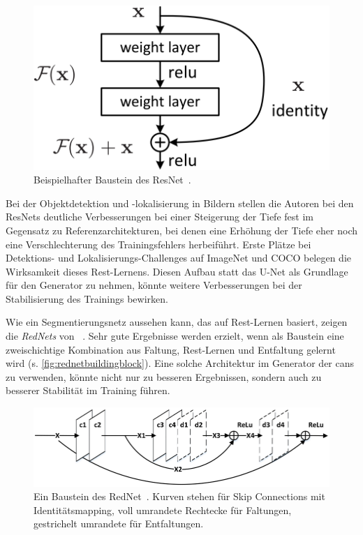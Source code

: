 \begin{figure}
	\centering
	\includegraphics[width=0.7\linewidth]{img/resnet_building_block}
	\caption[Beispielhafter Baustein des ResNet]{Beispielhafter Baustein des ResNet~\cite{He.2016}.}
	\label{fig:resnetbuildingblock}
\end{figure}

Bei der Objektdetektion und -lokalisierung in Bildern stellen die Autoren bei den ResNets deutliche Verbesserungen bei einer Steigerung der Tiefe fest im Gegensatz zu Referenzarchitekturen, bei denen eine Erhöhung der Tiefe eher noch eine Verschlechterung des Trainingsfehlers herbeiführt.
Erste Plätze bei Detektions- und Lokalisierungs-Challenges auf ImageNet und COCO belegen die Wirksamkeit dieses Rest-Lernens.
Diesen Aufbau statt das U-Net als Grundlage für den Generator zu nehmen, könnte weitere Verbesserungen bei der Stabilisierung des Trainings bewirken.

Wie ein Segmentierungsnetz aussehen kann, das auf Rest-Lernen basiert, zeigen die \emph{RedNets} von \citeauthor{Mao.2016}~\cite{Mao.2016}.
Sehr gute Ergebnisse werden erzielt, wenn als Baustein eine zweischichtige Kombination aus Faltung, Rest-Lernen und Entfaltung gelernt wird (s. \autoref{fig:rednetbuildingblock}).
Eine solche Architektur im Generator der \glspl{can} zu verwenden, könnte nicht nur zu besseren Ergebnissen, sondern auch zu besserer Stabilität im Training führen.

\begin{figure}
	\centering
	\includegraphics[width=0.7\linewidth]{img/rednet_building_block}
	\caption[Ein Baustein des RedNet]{Ein Baustein des RedNet~\cite{Mao.2016}. Kurven stehen für Skip Connections mit Identitätsmapping, voll umrandete Rechtecke für Faltungen, gestrichelt umrandete für Entfaltungen.}
	\label{fig:rednetbuildingblock}
\end{figure}



